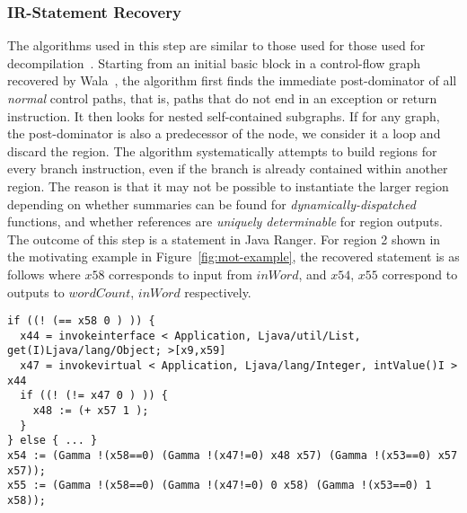 \subsubsection{IR-Statement Recovery}
%
The algorithms used in this step are similar to those used for those used for decompilation~\cite{Yakdan15@decompilation}. %
%
Starting from an initial basic block in a control-flow graph recovered by Wala~\cite{Wala}, the algorithm first finds
the immediate post-dominator of all {\em normal} control paths, that is, paths that do not end in an exception or return
instruction.
%
It then looks for nested self-contained subgraphs.
%
If for any graph, the post-dominator is also a predecessor of the node, we consider it a loop and discard the region.
%
The algorithm systematically attempts to build regions for every branch instruction, even if the branch is already
contained within another region.
%
The reason is that it may not be possible to instantiate the larger region depending on whether summaries can be found
for {\em dynamically-dispatched} functions, and whether references are {\em uniquely determinable} for region outputs.
%
The outcome of this step is a statement in Java Ranger.
%
For region 2 shown in the motivating example in Figure~\ref{fig:mot-example}, the recovered statement is as follows where
$x58$ corresponds to input from $inWord$, and $x54$, $x55$ correspond to outputs to $wordCount$,
$inWord$ respectively.
%
\begin{lstlisting}
if ((! (== x58 0 ) )) {
  x44 = invokeinterface < Application, Ljava/util/List, get(I)Ljava/lang/Object; >[x9,x59]
  x47 = invokevirtual < Application, Ljava/lang/Integer, intValue()I > x44
  if ((! (!= x47 0 ) )) {
    x48 := (+ x57 1 );
  }
} else { ... }
x54 := (Gamma !(x58==0) (Gamma !(x47!=0) x48 x57) (Gamma !(x53==0) x57 x57));
x55 := (Gamma !(x58==0) (Gamma !(x47!=0) 0 x58) (Gamma !(x53==0) 1 x58));

\end{lstlisting}
